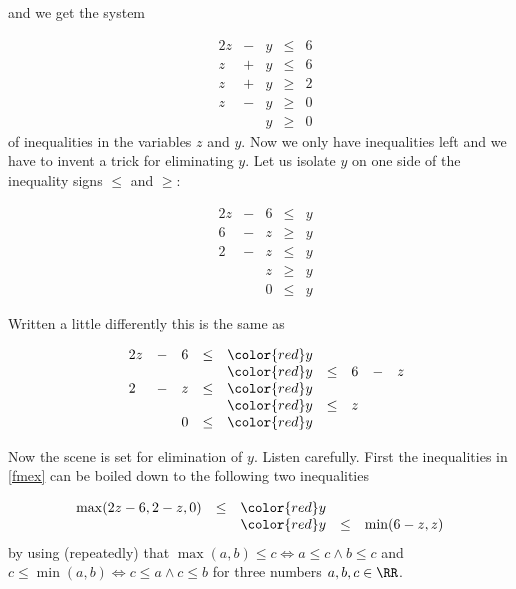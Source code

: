 \documentclass{article}
\begin{document}
and we get the system 

$$
  \begin{array}{llrrrl}
    &2 z &- &y&\leq &6\\
    &z &+ &y &\leq &6\\
    &z &+ & y &\geq &2\\
    &z &- &y &\geq &0\\
    &  &  &y   &\geq &0
  \end{array}
$$
  of inequalities
  in the variables $z$ and $y$. Now we only have inequalities left and we have to invent a trick for
  eliminating $y$. Let us isolate $y$ on one side of the inequality signs $\leq$ and $\geq$:

  $$
    \begin{array}{llrrrl}
    &2 z &- &6 &\leq &y\\
    &6 &- &z &\geq &y\\
    &2 &- &z &\leq &y\\
    & & &z &\geq &y\\
    &&&0 &\leq &y
  \end{array}
$$
  
  Written a little differently this is the same as

\begin{equation}\label{fmex}
  \begin{array}{llllllllll}
    &2 z &- &6&\leq &{\color{red} y} \\
    &&&&&{\color{red} y} &\leq &6 &- &z\\
    &2&- &z&\leq &{\color{red} y} \\
    &&&&&{\color{red} y} &\leq &z\\
    &&&0&\leq &{\color{red} y}
  \end{array}
\end{equation}

Now the scene is set for elimination of $y$. Listen carefully. First the inequalities in 
\eqref{fmex} can be boiled down to the following two inequalities

\begin{equation}\label{fmex1}
  \begin{array}{lllll}
\max(2 z - 6, 2 - z, 0) &\leq &{\color{red} y}\\
&& {\color{red} y} & \leq &\min(6 - z, z)
  \end{array}
\end{equation}
by using (repeatedly) that  $\max(a, b) \leq c \iff a\leq c \wedge b\leq c$ and
  $c\leq \min(a, b) \iff c\leq a \wedge c\leq b$ for three
numbers $a, b, c\in \RR$.
\end{document}
